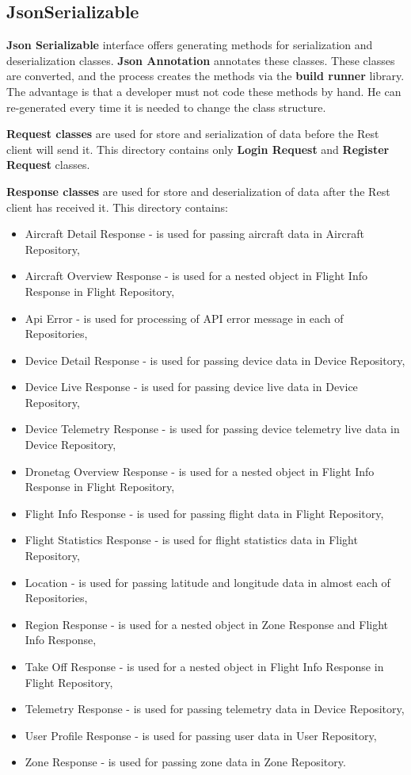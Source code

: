 \subsection{JsonSerializable}\label{subsec:jsonserializable-classes}
\textbf{Json Serializable} interface offers generating methods for serialization and deserialization classes.
\textbf{Json Annotation} annotates these classes.
These classes are converted, and the process creates the methods via the \textbf{build runner} library.
The advantage is that a developer must not code these methods by hand.
He can re-generated every time it is needed to change the class structure.

\textbf{Request classes} are used for store and serialization of data before the Rest client will send it.
This directory contains only \textbf{Login Request} and \textbf{Register Request} classes.

\textbf{Response classes} are used for store and deserialization of data after the Rest client has received it.
This directory contains:
\begin{itemize}
    \item Aircraft Detail Response - is used for passing aircraft data in Aircraft Repository,
    \item Aircraft Overview Response - is used for a nested object in Flight Info Response in Flight Repository,
    \item Api Error - is used for processing of API error message in each of Repositories,
    \item Device Detail Response - is used for passing device data in Device Repository,
    \item Device Live Response - is used for passing device live data in Device Repository,
    \item Device Telemetry Response - is used for passing device telemetry live data in Device Repository,
    \item Dronetag Overview Response - is used for a nested object in Flight Info Response in Flight Repository,
    \item Flight Info Response - is used for passing flight data in Flight Repository,
    \item Flight Statistics Response - is used for flight statistics data in Flight Repository,
    \item Location - is used for passing latitude and longitude data in almost each of Repositories,
    \item Region Response - is used for a nested object in Zone Response and Flight Info Response,
    \item Take Off Response - is used for a nested object in Flight Info Response in Flight Repository,
    \item Telemetry Response - is used for passing telemetry data in Device Repository,
    \item User Profile Response - is used for passing user data in User Repository,
    \item Zone Response - is used for passing zone data in Zone Repository.
\end{itemize}
